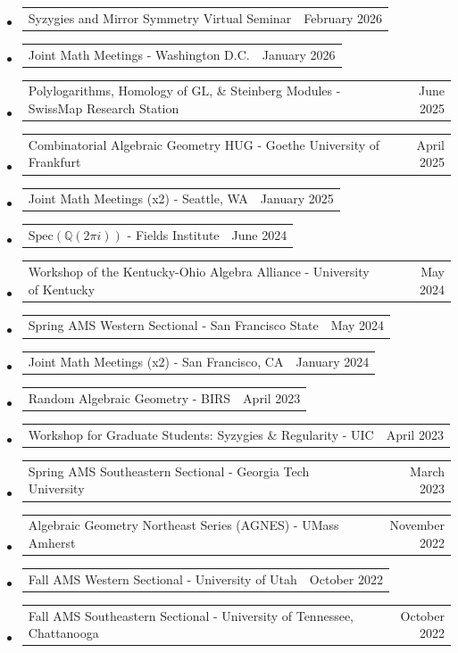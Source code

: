 \documentclass[letterpaper,11pt]{article}
\makeatletter
\newcommand{\ressubheadingTalk}[2]{
\begin{tabular*}{6.5in}[t]{l@{\cftdotfill{\cftsecdotsep}\extracolsep{\fill}}r}
		#1 & #2 \\
\end{tabular*}\vspace{-6pt}}
\makeatother
\begin{document}
\begin{itemize}
\item
	\ressubheadingTalk{Syzygies and Mirror Symmetry Virtual Seminar}{February 2026}
	
\item
	\ressubheadingTalk{Joint Math Meetings - Washington D.C.}{January 2026}
	
\item 
	\ressubheadingTalk{Polylogarithms, Homology of $\text{GL}$, \& Steinberg Modules - SwissMap Research Station}{June 2025}
	
\item 
	\ressubheadingTalk{Combinatorial Algebraic Geometry HUG - Goethe University of Frankfurt}{April 2025}

\item
	\ressubheadingTalk{Joint Math Meetings (x2) - Seattle, WA}{January 2025}

\item
	\ressubheadingTalk{$\text{Spec}(\mathbb{Q}(2\pi i))$ -  Fields Institute}{June 2024}
	
\item
	\ressubheadingTalk{Workshop of the Kentucky-Ohio Algebra Alliance -  University of Kentucky}{May 2024}
	
\item
	\ressubheadingTalk{Spring AMS Western Sectional - San Francisco State}{ May 2024}

\item
	\ressubheadingTalk{Joint Math Meetings (x2) - San Francisco, CA}{January 2024}


\item
	\ressubheadingTalk{Random Algebraic Geometry - BIRS}{April 2023}

\item
	\ressubheadingTalk{Workshop for Graduate Students: Syzygies \& Regularity - UIC}{April 2023}

\item
	\ressubheadingTalk{Spring AMS Southeastern Sectional - Georgia Tech University}{March 2023}
	
\item
	\ressubheadingTalk{Algebraic Geometry Northeast Series (AGNES) - UMass Amherst}{November 2022}
	
\item
	\ressubheadingTalk{Fall AMS Western Sectional - University of Utah}{October 2022}
	
\item
	\ressubheadingTalk{Fall AMS Southeastern Sectional - University of Tennessee, Chattanooga}{October 2022}
	

\end{itemize}
\end{document}
